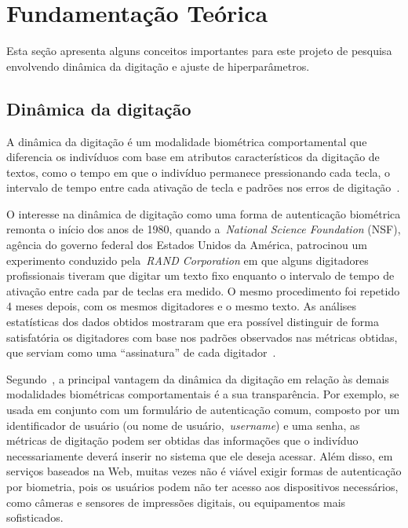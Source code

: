 \section{Fundamentação Teórica}\label{sec:fundamentacao_teorica}

Esta seção apresenta alguns conceitos importantes para este projeto de pesquisa envolvendo dinâmica da digitação e ajuste de hiperparâmetros.


\subsection{Dinâmica da digitação}\label{subsec:dinamica_de_digitacao}

A dinâmica da digitação é um modalidade biométrica comportamental que diferencia os indivíduos com base em atributos característicos da digitação de textos, como o tempo em que o indivíduo permanece pressionando cada tecla, o intervalo de tempo entre cada ativação de tecla e padrões nos erros de digitação~\cite{biometric_personal_auth_using_keystroke_dynamics}.

O interesse na dinâmica de digitação como uma forma de autenticação biométrica remonta o início dos anos de 1980, quando a~\textit{National Science Foundation} (NSF), agência do governo federal dos Estados Unidos da América, patrocinou um experimento conduzido pela~\textit{RAND Corporation} em que alguns digitadores profissionais tiveram que digitar um texto fixo enquanto o intervalo de tempo de ativação entre cada par de teclas era medido. O mesmo procedimento foi repetido 4 meses depois, com os mesmos digitadores e o mesmo texto. As análises estatísticas dos dados obtidos mostraram que era possível distinguir de forma satisfatória os digitadores com base nos padrões observados nas métricas obtidas, que serviam como uma ``assinatura'' de cada digitador~\cite{authentication_by_keystroke_timing}.

Segundo~, a principal vantagem da dinâmica da digitação em relação às demais modalidades biométricas comportamentais é a sua transparência. Por exemplo, se usada em conjunto com um formulário de autenticação comum, composto por um identificador de usuário (ou nome de usuário,~\textit{username}) e uma senha, as métricas de digitação podem ser obtidas das informações que o indivíduo necessariamente deverá inserir no sistema que ele deseja acessar. Além disso, em serviços baseados na Web, muitas vezes não é viável exigir formas de autenticação por biometria, pois os usuários podem não ter acesso aos dispositivos necessários, como câmeras e sensores de impressões digitais, ou equipamentos mais sofisticados.

